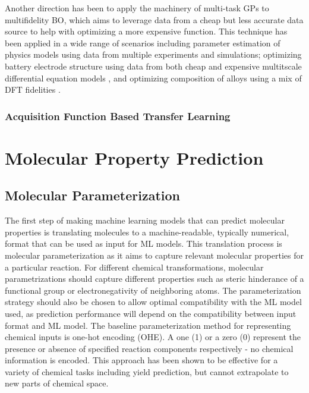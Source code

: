 Another direction has been to apply the machinery of multi-task GPs to multifidelity BO, which aims to leverage data from a cheap but less accurate data source to help with optimizing a more expensive function.\cite{Huang2006, Forrester2007} This technique has been applied in a wide range of scenarios including parameter estimation of physics models using data from multiple experiments and simulations;\cite{Perdikaris2016} optimizing battery electrode structure using data from both cheap and expensive multitscale differential equation models \cite{Pan2017, Folch2023}, and optimizing composition of alloys using a mix of DFT fidelities \cite{Tran2020}.

\subsubsection{Acquisition Function Based Transfer Learning}

\section{Molecular Property Prediction}

\subsection{Molecular Parameterization}

The first step of making machine learning models that can predict molecular properties is translating molecules to a machine-readable, typically numerical, format that can be used as input for ML models. This translation process is molecular parameterization as it aims to capture relevant molecular properties for a particular reaction. For different chemical transformations, molecular parametrizations should capture different properties such as steric hinderance of a functional group or electronegativity of neighboring atoms. The parameterization strategy should also be chosen to allow optimal compatibility with the ML model used, as prediction performance will depend on the compatibility between input format and ML model.
The baseline parameterization method for representing chemical inputs is one-hot encoding (OHE). A one (1) or a zero (0) represent the presence or absence of specified reaction components respectively - no chemical information is encoded. This approach has been shown to be effective for a variety of chemical tasks including yield prediction, but cannot extrapolate to new parts of chemical space.\cite{Pomberger2023} 

